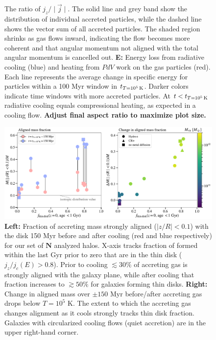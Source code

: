 \documentclass[fleqn,usenatbib]{mnras}
\newcommand{\tcon}{t_{T=10^5\,{\rm K}}}
\begin{document}
\begin{figure}
{The ratio of $j_z / \mid \vec j \mid$.
The solid line and grey band show the distribution of individual accreted particles, while the dashed line shows the vector sum of all accreted particles.
The shaded region shrinks as gas flows inward, indicating the flow becomes more coherent and that angular momentum not aligned with the total angular momentum is cancelled out. 
\textbf{E:}
Energy loss from radiative cooling (blue) and heating from $PdV$ work on the gas particles (red).
Each line represents the average change in specific energy for particles within a 100 Myr window in $\tcon$.
Darker colors indicate time windows with more accreted particles.
At $t<\tcon$ radiative cooling equals compressional heating, as expected in a cooling flow. 
\textbf{
Adjust final aspect ratio to maximize plot size.
}
}
\label{f: before and after}
\end{figure}

\begin{figure}
    \centering
    \includegraphics[width=\textwidth]{figures/prevalence/aligned_fraction.pdf}
    \caption{
    \textbf{Left:}
    Fraction of accreting mass strongly aligned ($\mid z/R \mid < 0.1$) with the disk 150 Myr before and after cooling (red and blue respectively) for our set of $\mathbf{N}$ analyzed halos.
    X-axis tracks fraction of formed within the last Gyr prior to zero that are in the thin disk ($j_z/j_c(E)>0.8$).
    Prior to cooling $\lesssim 30\%$ of accreting gas is strongly aligned with the galaxy plane,
    while after cooling that fraction increases to $\gtrsim 50\%$ for galaxies forming thin disks.
    \textbf{Right:}
    Change in aligned mass over $\pm 150$ Myr before/after accreting gas drops below $T = 10^5$ K.
    The extent to which the accreting gas changes alignment as it cools strongly tracks thin disk fraction.
    Galaxies with circularized cooling flows (quiet accretion) are in the upper right-hand corner.
    }
    \label{f: prevalence}
\end{figure}
\end{document}
